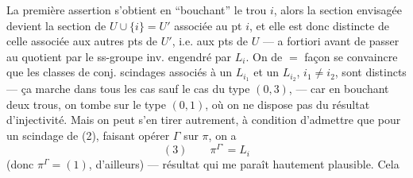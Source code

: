 La première assertion s'obtient en ``bouchant''
le trou $i$, alors la section envisagée devient
la section de $U\cup\{i\}=U'$ associée au pt $i$,
et elle est donc distincte de celle associée
aux  autres pts de $U'$, i.e. aux pts de
$U$ --- a fortiori avant de passer au
quotient par le ss-groupe inv. engendré
par $L_i$. On  de $=$ façon se
convaincre que les classes de conj. 
scindages associés à un $L_{i_1}$ et un $L_{i_2}$, $i_1\ne i_2$,
sont distincts --- ça marche dans tous les
cas sauf le cas du type $(0,3)$, ---
car en bouchant deux trous, on tombe
sur le type $(0,1)$, où on ne dispose pas
du résultat d'injectivité. Mais on
peut s'en tirer autrement, à condition
d'admettre que pour un scindage de
(2), faisant opérer $\Gamma$ sur $\pi$, on a
\[
(3)\qquad\pi^{\Gamma^\circ}=L_i
\]
(donc $\pi^\Gamma=(1)$, d'ailleurs) --- résultat
qui me paraît hautement plausible. Cela

